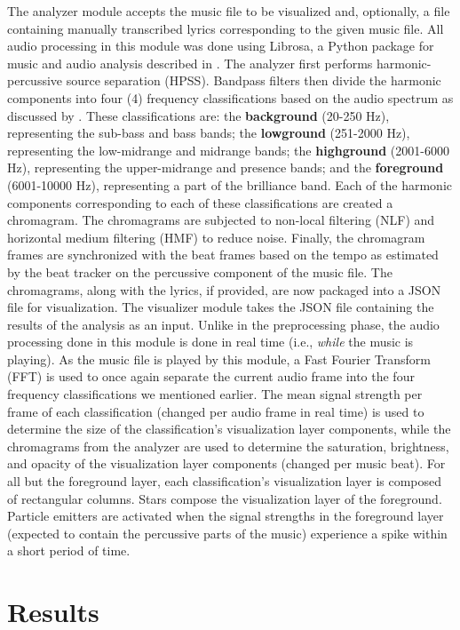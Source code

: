 \documentclass{sigchi-ext}
\begin{document}
The analyzer module accepts the music file to be visualized and, optionally, a file containing manually transcribed lyrics corresponding to the given music file. All audio processing in this module was done using Librosa, a Python package for music and audio analysis described in \cite{McFee:2015}. The analyzer first performs harmonic-percussive source separation (HPSS). Bandpass filters then divide the harmonic components into four (4) frequency classifications based on the audio spectrum as discussed by \cite{Leigh:2018}. These classifications are: the \textbf{background} (20-250 Hz), representing the sub-bass and bass bands; the \textbf{lowground} (251-2000 Hz), representing the low-midrange and midrange bands; the \textbf{highground} (2001-6000 Hz), representing the upper-midrange and presence bands; and the \textbf{foreground} (6001-10000 Hz), representing a part of the brilliance band. Each of the harmonic components corresponding to each of these classifications are created a chromagram. The chromagrams are subjected to non-local filtering (NLF) and horizontal medium filtering (HMF) to reduce noise. Finally, the chromagram frames are synchronized with the beat frames based on the tempo as estimated by the beat tracker on the percussive component of the music file. The chromagrams, along with the lyrics, if provided, are now packaged into a JSON file for visualization. The visualizer module takes the JSON file containing the results of the analysis as an input. Unlike in the preprocessing phase, the audio processing done in this module is done in real time (i.e., \textit{while} the music is playing). As the music file is played by this module, a Fast Fourier Transform (FFT) is used to once again separate the current audio frame into the four frequency classifications we mentioned earlier. The mean signal strength per frame of each classification (changed per audio frame in real time) is used to determine the size of the classification's visualization layer components, while the chromagrams from the analyzer are used to determine the saturation, brightness, and opacity of the visualization layer components (changed per music beat). For all but the foreground layer, each classification's visualization layer is composed of rectangular columns. Stars compose the visualization layer of the foreground. Particle emitters are activated when the signal strengths in the foreground layer (expected to contain the percussive parts of the music) experience a spike within a short period of time.

\section{Results}
\end{document}
